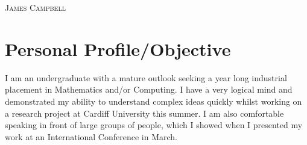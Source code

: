 \documentclass[a4paper]{article}
\begin{document}
\pagestyle{empty} %
\begin{multicols}{2}

\raggedright{\textsc{\Huge{James Campbell}}}\\
\columnbreak
{}

\end{multicols}
\section{Personal Profile/Objective}
I am an undergraduate with a mature outlook seeking a year long industrial placement in Mathematics and/or Computing. I have a very logical mind and demonstrated my ability to understand complex ideas quickly whilst working on a research project at Cardiff University this summer. I am also comfortable speaking in front of large groups of people, which I showed when I presented my work at an International Conference in March.

\end{document}
